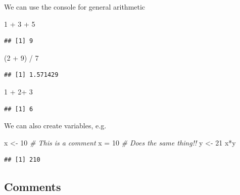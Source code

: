 \documentclass[]{article}
\newenvironment{Shaded}{\begin{snugshade}}{\end{snugshade}}
\newcommand{\CommentTok}[1]{\textcolor[rgb]{0.56,0.35,0.01}{\textit{#1}}}
\newcommand{\DecValTok}[1]{\textcolor[rgb]{0.00,0.00,0.81}{#1}}
\newcommand{\NormalTok}[1]{#1}
\newcommand{\OtherTok}[1]{\textcolor[rgb]{0.56,0.35,0.01}{#1}}
\newcommand{\SpecialCharTok}[1]{\textcolor[rgb]{0.00,0.00,0.00}{#1}}
\begin{document}
We can use the console for general arithmetic

\begin{Shaded}
\begin{Highlighting}[]
\DecValTok{1} \SpecialCharTok{+} \DecValTok{3} \SpecialCharTok{+} \DecValTok{5}
\end{Highlighting}
\end{Shaded}

\begin{verbatim}
## [1] 9
\end{verbatim}

\begin{Shaded}
\begin{Highlighting}[]
\NormalTok{(}\DecValTok{2} \SpecialCharTok{+} \DecValTok{9}\NormalTok{) }\SpecialCharTok{/} \DecValTok{7}
\end{Highlighting}
\end{Shaded}

\begin{verbatim}
## [1] 1.571429
\end{verbatim}

\begin{Shaded}
\begin{Highlighting}[]
\DecValTok{1} \SpecialCharTok{+} \DecValTok{2}\SpecialCharTok{+} \DecValTok{3}
\end{Highlighting}
\end{Shaded}

\begin{verbatim}
## [1] 6
\end{verbatim}

We can also create variables, e.g.

\begin{Shaded}
\begin{Highlighting}[]
\NormalTok{x }\OtherTok{\textless{}{-}} \DecValTok{10} \CommentTok{\# This is a comment}
\NormalTok{x }\OtherTok{=} \DecValTok{10} \CommentTok{\# Does the same thing!!}
\NormalTok{y }\OtherTok{\textless{}{-}} \DecValTok{21}
\NormalTok{x}\SpecialCharTok{*}\NormalTok{y}
\end{Highlighting}
\end{Shaded}

\begin{verbatim}
## [1] 210
\end{verbatim}

\hypertarget{comments}{%
\subsection{Comments}\label{comments}}
\end{document}
